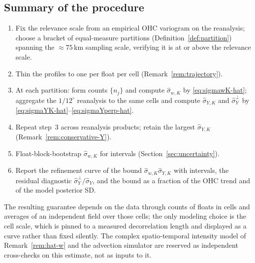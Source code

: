 \subsection{Summary of the procedure}
\label{sec:procedure}

\begin{enumerate}
\item Fix the relevance scale from an empirical OHC variogram on the
  reanalysis; choose a bracket of equal-measure partitions
  (Definition~\ref{def:partition}) spanning the ${\approx}75$\,km
  sampling scale, verifying it is at or above the relevance scale.
\item Thin the profiles to one per float per cell
  (Remark~\ref{rem:trajectory}).
\item At each partition: form counts $\{n_j\}$ and compute
  $\hat\sigma_{w,K}$ by \eqref{eq:sigmawK-hat}; aggregate the
  $1/12^\circ$ reanalysis to the same cells and compute
  $\hat\sigma_{Y,K}$ and $\hat\sigma_Y^{\perp}$ by
  \eqref{eq:sigmaYK-hat}--\eqref{eq:sigmaYperp-hat}.
\item Repeat step~3 across reanalysis products; retain the largest
  $\hat\sigma_{Y,K}$ (Remark~\ref{rem:conservative-Y}).
\item Float-block-bootstrap $\hat\sigma_{w,K}$ for intervals
  (Section~\ref{sec:uncertainty}).
\item Report the refinement curve of the bound
  $\hat\sigma_{w,K}\hat\sigma_{Y,K}$ with intervals, the residual
  diagnostic $\hat\sigma_Y^{\perp}/\hat\sigma_Y$, and the bound as a
  fraction of the OHC trend and of the model posterior SD.
\end{enumerate}

The resulting guarantee depends on the data through counts of floats in
cells and averages of an independent field over those cells; the only
modeling choice is the cell scale, which is pinned to a measured
decorrelation length and displayed as a curve rather than fixed
silently. The complex spatio-temporal intensity model of
Remark~\ref{rem:hat-w} and the advection simulator are reserved as
independent cross-checks on this estimate, not as inputs to it.
